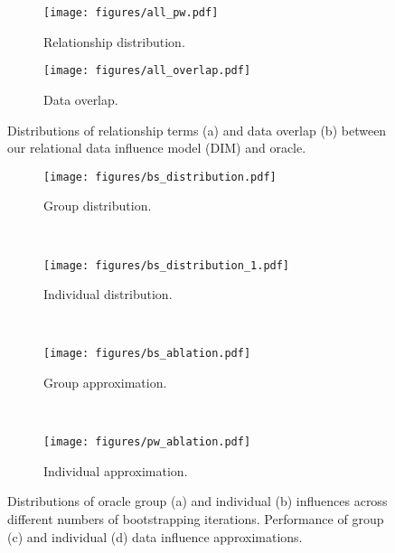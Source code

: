 \begin{figure}[t]
    \centering
    \begin{subfigure}{0.212\textwidth}
    \centering
    \texttt{[image: figures/all\_pw.pdf]}
    \caption{Relationship distribution.}
    \label{fig:dis-rel}
    \end{subfigure}
    \begin{subfigure}{0.212\textwidth}
    \centering
    \texttt{[image: figures/all\_overlap.pdf]}
    \caption{Data overlap.}
    \label{fig:overlap-rel}
    \end{subfigure}
    \vspace{-0.35cm}
    \caption{Distributions of relationship terms (a) and data overlap (b) between our relational data influence model (DIM) and oracle.} 
    \label{fig:relationship}
    \vspace{-0.3cm}
\end{figure}



\begin{figure*}
    \centering
    \vspace{-0.2cm}
    \begin{subfigure}{0.238\textwidth}
    \centering
    \texttt{[image: figures/bs\_distribution.pdf]}
    \caption{Group distribution.}
    \label{fig:pairwise-dis}
    \end{subfigure}
    ~
    \begin{subfigure}{0.245\textwidth}
    \centering
    \texttt{[image: figures/bs\_distribution\_1.pdf]}
    \caption{Individual distribution.}
    \label{fig:individual-dis}
    \end{subfigure}
    ~
    \begin{subfigure}{0.232\textwidth}
    \centering
    \texttt{[image: figures/bs\_ablation.pdf]}
    \caption{Group approximation.}
    \label{fig:pairwise-approx}
    \end{subfigure}
    ~
    \begin{subfigure}{0.232\textwidth}
    \centering
    \texttt{[image: figures/pw\_ablation.pdf]}
    \caption{Individual approximation.}
    \label{fig:individual-approx}
    \end{subfigure}
    \caption{Distributions of oracle group (a) and individual (b) influences across different numbers of bootstrapping iterations. Performance of group (c) and individual (d) data influence approximations.}
    \label{fig:pwdim}
    \vspace{-0.3cm}
\end{figure*}

